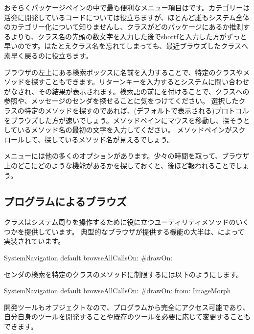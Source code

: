 \documentclass[a4paper,10pt,twoside]{book}
\begin{document}
おそらくパッケージペインの中で最も便利なメニュー項目はです。カテゴリーは活発に開発しているコードについては役立ちますが、ほとんど誰もシステム全体のカテゴリー化について知りませんし、クラスがどのパッケージにあるか推測するよりも、クラス名の先頭の数文字を入力した後でshort{f}と入力した方がずっと早いのです。はたとえクラス名を忘れてしまっても、最近ブラウズしたクラスへ素早く戻るのに役立ちます。

ブラウザの左上にある検索ボックスに名前を入力することで、特定のクラスやメソッドを探すこともできます。リターンキーを入力するとシステムに問い合わせがなされ、その結果が表示されます。検索語の前に\ct{#}を付けることで、クラスへの参照や、メッセージのセンダを探せることに気をつけてください。
選択したクラスの特定のメソッドを探すのであれば、(デフォルトで表示される)プロトコルをブラウズした方が速いでしょう。メソッドペインにマウスを移動し、探そうとしているメソッド名の最初の文字を入力してください。
メソッドペインがスクロールして、探しているメソッド名が見えるでしょう。


メニューには他の多くのオプションがあります。少々の時間を取って、ブラウザ上のどこにどのような機能があるかを探しておくと、後ほど報われることでしょう。


\subsection{プログラムによるブラウズ}

クラスはシステム周りを操作するために役に立つユーティリティメソッドのいくつかを提供しています。
典型的なブラウザが提供する機能の大半は、によって実装されています。

\begin{code}{}
SystemNavigation default browseAllCallsOn: #drawOn:
\end{code}
センダの検索を特定のクラスのメソッドに制限するには以下のようにします。
\begin{code}{}
SystemNavigation default browseAllCallsOn: #drawOn: from: ImageMorph
\end{code}
開発ツールもオブジェクトなので、プログラムから完全にアクセス可能であり、自分自身のツールを開発することや既存のツールを必要に応じて変更することもできます。
\end{document}

